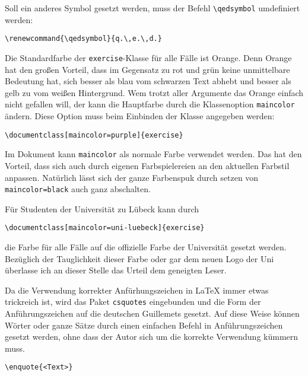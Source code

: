 \documentclass{exercise}
\begin{document}
    Soll ein anderes Symbol gesetzt werden, muss der Befehl \lstinline-\qedsymbol- umdefiniert werden:
    \begin{lstlisting}[gobble=6]
      \renewcommand{\qedsymbol}{q.\,e.\,d.}
    \end{lstlisting}

  \label{section-farbe}
    Die Standardfarbe der \texttt{exercise}-Klasse für alle Fälle ist Orange. Denn Orange hat den großen Vorteil, dass im Gegensatz zu rot und grün keine unmittelbare Bedeutung hat, sich besser als blau vom schwarzen Text abhebt und besser als gelb zu vom weißen Hintergrund. Wem trotzt aller Argumente das Orange einfach nicht gefallen will, der kann die Hauptfarbe durch die Klassenoption \lstinline{maincolor} ändern. Diese Option muss beim Einbinden der Klasse angegeben werden:
    \begin{lstlisting}[gobble=6]
      \documentclass[maincolor=purple]{exercise}
    \end{lstlisting}
    
    Im Dokument kann \lstinline{maincolor} als normale Farbe verwendet werden. Das hat den Vorteil, dass sich auch durch eigenen Farbspielereien an den aktuellen Farbstil anpassen. Natürlich lässt sich der ganze Farbenspuk durch setzen von \lstinline{maincolor=black} auch ganz abschalten.
    
    Für Studenten der Universität zu Lübeck kann durch
    \begin{lstlisting}[gobble=6]
      \documentclass[maincolor=uni-luebeck]{exercise}
    \end{lstlisting}
    die Farbe für alle Fälle auf die offizielle Farbe der Universität gesetzt werden. Bezüglich der Tauglichkeit dieser Farbe oder gar dem neuen Logo der Uni überlasse ich an dieser Stelle das Urteil dem geneigten Leser.
    
    Da die Verwendung korrekter Anfürhungszeichen in \LaTeX{} immer etwas trickreich ist, wird das Paket \texttt{csquotes} \cite{csquotes} eingebunden und die Form der Anführungszeichen auf die deutschen Guillemets gesetzt. Auf diese Weise können Wörter oder ganze Sätze durch einen einfachen Befehl in Anführungszeichen gesetzt werden, ohne dass der Autor sich um die korrekte Verwendung kümmern muss.
    \begin{lstlisting}[gobble=6]
      \enquote{<Text>}
    \end{lstlisting}
    
\end{document}

